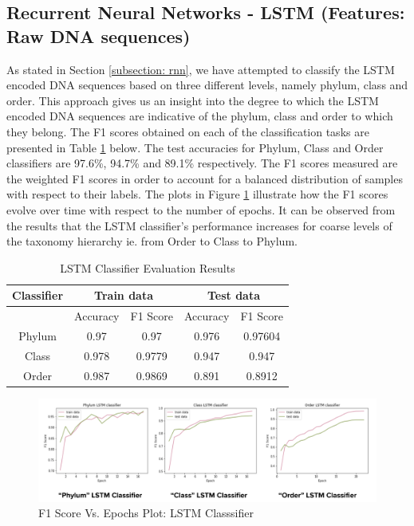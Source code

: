 \documentclass[12pt]{article}
\begin{document}
        \subsection{Recurrent Neural Networks - LSTM (Features: Raw DNA sequences)}
        \label{subsection: rnnresults}
        As stated in Section \ref{subsection: rnn}, we have attempted to classify the LSTM encoded DNA sequences based on three different levels, namely phylum, class and order. This approach gives us an insight into the degree to which the LSTM encoded DNA sequences are indicative of the phylum, class and order to which they belong. The F1 scores obtained on each of the classification tasks are presented in Table \ref{table:lstmeval} below. The test accuracies for Phylum, Class and Order classifiers are 97.6\%, 94.7\% and 89.1\% respectively. The F1 scores measured are the weighted F1 scores in order to account for a balanced distribution of samples with respect to their labels. The plots in Figure \ref{fig:lstm} illustrate how the F1 scores evolve over time with respect to the number of epochs. It can be observed from the results that the LSTM classifier's performance increases for coarse levels of the taxonomy hierarchy ie. from Order to Class to Phylum.

         \begin{center}
             \begin{table}
             \centering
             \begin{tabular}{| c | c | c | c | c |}
                 \hline
                 Classifier & \multicolumn{2}{c|}{Train data} & \multicolumn{2}{c|}{Test data} \\ \hline
                 {} & Accuracy & F1 Score & Accuracy & F1 Score \\ \hline
                 Phylum & 0.97 & 0.97 & 0.976 & 0.97604 \\ \hline
                 Class & 0.978 & 0.9779 & 0.947 & 0.947 \\ \hline
                 Order & 0.987 & 0.9869 & 0.891 & 0.8912 \\ \hline
                \end{tabular}
                \caption{LSTM Classifier Evaluation Results}
                \label{table:lstmeval}
            \end{table}
        \end{center}

        \begin{figure}[h]
        \centering
        \includegraphics[scale=0.35]{lstm.png}
        \caption{F1 Score Vs. Epochs Plot: LSTM Classsifier}
        \label{fig:lstm}
        \end{figure}
\end{document}

